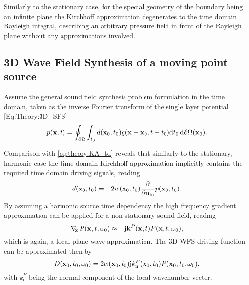 Similarly to the stationary case, for the special geometry of the boundary being an infinite plane the Kirchhoff approximation degenerates to the time domain Rayleigh integral, describing an arbitrary pressure field in front of the Rayleigh plane without any approximations involved.

\subsection{3D Wave Field Synthesis of a moving point source}

Assume the general sound field synthesis problem formulation in the time domain, taken as the inverse Fourier transform of the single layer potential \eqref{Eq:Theory:3D_SFS}
\begin{equation}
p(\mathbf{x},t) = \oint_{\partial \Omega} \int_{t_0} d(\mathbf{x}_0,t_0) g(\mathbf{x} - \mathbf{x}_0 , t-t_0 ) \mathrm{d} t_0 \, \mathrm{d} \partial \Omega ( \mathbf{x}_0 ).
\label{eq:moving_source:SFS_problem_td}
\end{equation}

Comparison with \eqref{eq:theory:KA_td} reveals that similarly to the stationary, harmonic case the time domain Kirchhoff approximation implicitly contains the required time domain driving signals, reading
\begin{equation}
\label{eq:moving_source:3D_wfs_driv_fun_td}
d(\mathbf{x}_0,t_0) =  -2 w(\mathbf{x}_0,t_0) \frac{\partial}{\partial \mathbf{n}_{\mathrm{in}}}  p(\mathbf{x}_0,t_0).
\end{equation}
By assuming a harmonic source time dependency the high frequency gradient approximation can be applied for a non-stationary sound field, reading
\begin{equation}
\nabla_{\!\!\mathbf{x}}\, P(\mathbf{x},t,\omega_0) \approx - \mathrm{j} \mathbf{k}^P(\mathbf{x},t) P(\mathbf{x},t,\omega_0),
\label{eq:moving_source:gradient_appr_nonstat}
\end{equation}
which is again, a local plane wave approximation.
The 3D WFS driving function can be approximated then by
\begin{equation}
\label{eq:moving_source:3D_wfs_driv_fun}
D(\mathbf{x}_0,t_0,\omega_0) =  2 w(\mathbf{x}_0,t_0) \mathrm{j} k_{\mathrm{n}}^P(\mathbf{x}_0,t_0) P(\mathbf{x}_0,t_0,\omega_0),
\end{equation}
with $k_{\mathrm{n}}^P$ being the normal component of the local wavenumber vector.
	
